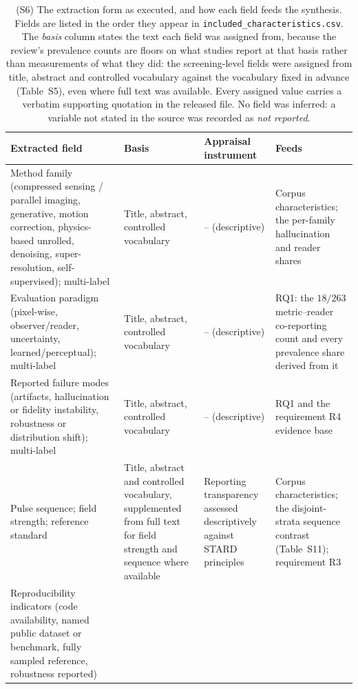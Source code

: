 \documentclass[11pt]{article}
\begin{document}
\begin{table}[t]
\centering
\caption{(S6) The extraction form as executed, and how each field feeds the synthesis.
Fields are listed in the order they appear in \texttt{included\_characteristics.csv}. The
\emph{basis} column states the text each field was assigned from, because the review's
prevalence counts are floors on what studies report at that basis rather than measurements
of what they did: the screening-level fields were assigned from title, abstract and
controlled vocabulary against the vocabulary fixed in advance (Table~S5), even where full
text was available. Every assigned value carries a verbatim supporting quotation in the
released file. No field was inferred: a variable not stated in the source was recorded as
\emph{not reported}.}
\label{tab:extraction}
\small
\setlength{\tabcolsep}{5pt}
\renewcommand{\arraystretch}{1.15}
\begin{tabular}{p{} p{} p{} p{}}
\hline
\textbf{Extracted field} & \textbf{Basis} & \textbf{Appraisal instrument} & \textbf{Feeds} \\
\hline
Method family (compressed sensing / parallel imaging, generative, motion correction,
physics-based unrolled, denoising, super-resolution, self-supervised); multi-label
& Title, abstract, controlled vocabulary
& -- (descriptive)
& Corpus characteristics; the per-family hallucination and reader shares \\
\hline
Evaluation paradigm (pixel-wise, observer/reader, uncertainty, learned/perceptual);
multi-label
& Title, abstract, controlled vocabulary
& -- (descriptive)
& RQ1: the $18/263$ metric--reader co-reporting count and every prevalence share derived
from it \\
\hline
Reported failure modes (artifacts, hallucination or fidelity instability, robustness or
distribution shift); multi-label
& Title, abstract, controlled vocabulary
& -- (descriptive)
& RQ1 and the requirement R4 evidence base \\
\hline
Pulse sequence; field strength; reference standard
& Title, abstract and controlled vocabulary, supplemented from full text for field
strength and sequence where available
& Reporting transparency assessed descriptively against STARD principles
\cite{bossuyt2015stard}
& Corpus characteristics; the disjoint-strata sequence contrast (Table~S11); requirement R3 \\
\hline
Reproducibility indicators (code availability, named public dataset or benchmark, fully
sampled reference, robustness reported)

\end{tabular}
\end{table}
\end{document}

